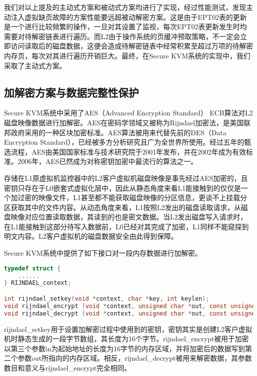 我们对以上提及的主动式方案和被动式方案均进行了实现，经过性能测试，发现主动注入虚拟缺页故障的方案性能要远超被动解密方案。这是由于EPT02表的更新是一个进行比较频繁的操作，一旦对其设置了监视，每次EPT02表更新发生时均需要对待解密链表进行遍历。而L2由于操作系统的页缓冲预取策略，不一定会立即访问读取后的磁盘数据，这便会造成待解密链表中经常积累至超过万项的待解密内存页，每次对其进行遍历开销巨大。最终，在Secure KVM系统的实现中，我们采取了主动式方案。

\subsection{加解密方案与数据完整性保护}

Secure KVM系统中采用了AES（Advanced Encryption Standard） ECB算法对L2磁盘映像数据进行加解密。AES在密码学领域又被称为Rijndael加密法，是美国联邦政府采用的一种区块加密标准。AES算法被用来代替先前的DES（Data Encryption Standard），已经被多方分析研究且广为全世界所使用。经过五年的甄选流程，AES由美国国家标准与技术研究院于2001年发布，并在2002年成为有效标准。2006年，AES已然成为对称密钥加密中最流行的算法之一。

存储在L1原虚拟机监控器中的L2客户虚拟机磁盘映像是事先经过AES加密的，且密钥只存在于L0嵌套式虚拟化层中，因此从静态角度来看L1能接触到的仅仅是一个加过密的映像文件，L1甚至都不能获取磁盘映像的分区信息，更谈不上挂载分区获取其中的文件内容。从动态角度来看，L1按照L2发出的磁盘读取请求，从磁盘映像对应位置读取数据，其读到的也是密文数据。当L2发出磁盘写入请求时，在L1能接触到这部分待写入数据前，L0已经对其完成了加密，L1同样不能窥探到明文内容。L2客户虚拟机的磁盘数据安全由此得到保障。

Secure KVM系统中提供了如下接口对一段内存数据进行加解密。

\begin{lstlisting}[language={C}, caption={inject\_virtual\_ept\_fault实现源代码}]
typedef struct {
	......
} RIJNDAEL_context;

int rijndael_setkey(void *context, char *key, int keylen);
void rijndael_encrypt (void *context, unsigned char *out, const unsigned char *in);
void rijndael_decrypt (void *context, unsigned char *out, const unsigned char *in);
\end{lstlisting}

rijndael\_setkey用于设置加解密过程中使用到的密钥，密钥其实是创建L2客户虚拟机时静态生成的一段字节数组，其长度为16个字节。rijndael\_encrypt被用于加密以第三个参数in为起始地址的长度为16字节的内存区域，并将加密后的数据写到第二个参数out所指向的内存区域。相反，rijndael\_decrypt被用来解密数据，其参数数目和意义与rijndael\_encrypt完全相同。

